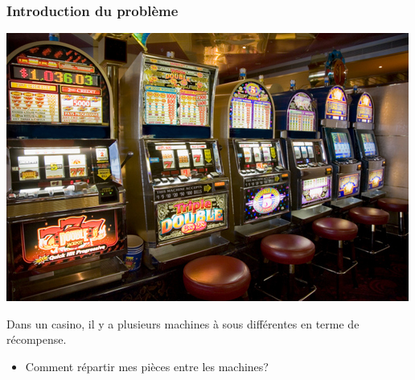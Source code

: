 \documentclass[compress, color = usenames, dvipsnames]{beamer}
\begin{document}
\begin{frame}
    \frametitle{Introduction du problème}
    \begin{center}
        \includegraphics[scale=0.8]{figs/bandit_casino.jpg}
    \end{center}
    Dans un casino, il y a plusieurs machines à sous différentes en terme de récompense.
    \begin{itemize}
        \item Comment répartir mes pièces entre les machines?
    \end{itemize}
\end{frame}
\end{document}
